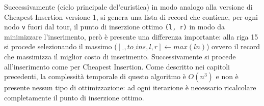 \documentclass[a4paper,12pt]{report}
\begin{document}
Successivamente (ciclo principale del'euristica) in modo analogo alla versione di Cheapest Insertion versione 1, si genera una lista di record che contiene, per ogni nodo \lstinline|v| fuori dal tour, il punto di inserzione ottimo \lstinline!(l, r)! in modo da minimizzare l'inserimento, però è presente una differenza importante: alla riga 15 si procede selezionando il massimo ($[\_, to\_ins, l, r] \gets max(ln)$) ovvero il record che massimizza il miglior costo di inserimento. Successivamente si procede all'inserimento come per Cheapest Insertion. \newline
Come descritto nei capitoli precedenti, la complessità temporale di questo algoritmo è $O(n^3)$ e non è presente nessun tipo di ottimizzazione: ad ogni iterazione è necessario ricalcolare completamente il punto di inserzione ottimo.
\end{document}
